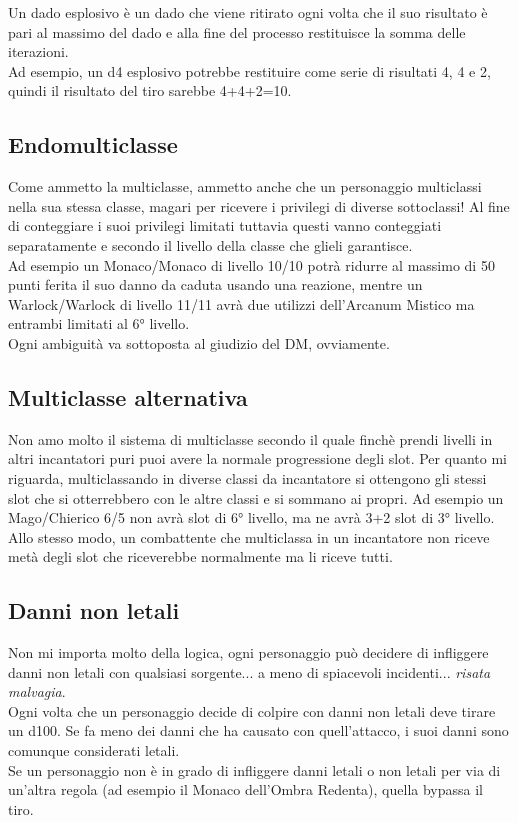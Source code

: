 Un dado esplosivo è un dado che viene ritirato ogni volta che il suo risultato è pari al massimo del dado e alla fine del processo restituisce la somma delle iterazioni. \\ Ad esempio, un d4 esplosivo potrebbe restituire come serie di risultati 4, 4 e 2, quindi il risultato del tiro sarebbe 4+4+2=10.

\subsection{Endomulticlasse}

Come ammetto la multiclasse, ammetto anche che un personaggio multiclassi nella sua stessa classe, magari per ricevere i privilegi di diverse sottoclassi! Al fine di conteggiare i suoi privilegi limitati tuttavia questi vanno conteggiati separatamente e secondo il livello della classe che glieli garantisce. \\ Ad esempio un Monaco/Monaco di livello 10/10 potrà ridurre al massimo di 50 punti ferita il suo danno da caduta usando una reazione, mentre un Warlock/Warlock di livello 11/11 avrà due utilizzi dell'Arcanum Mistico ma entrambi limitati al 6° livello. \\ Ogni ambiguità va sottoposta al giudizio del DM, ovviamente.

\subsection{Multiclasse alternativa}

Non amo molto il sistema di multiclasse secondo il quale finchè prendi livelli in altri incantatori puri puoi avere la normale progressione degli slot. Per quanto mi riguarda, multiclassando in diverse classi da incantatore si ottengono gli stessi slot che si otterrebbero con le altre classi e si sommano ai propri. Ad esempio un Mago/Chierico 6/5 non avrà slot di 6° livello, ma ne avrà 3+2 slot di 3° livello. Allo stesso modo, un combattente che multiclassa in un incantatore non riceve metà degli slot che riceverebbe normalmente ma li riceve tutti.

\subsection{Danni non letali}

Non mi importa molto della logica, ogni personaggio può decidere di infliggere danni non letali con qualsiasi sorgente... a meno di spiacevoli incidenti... \textit{risata malvagia}. \\ Ogni volta che un personaggio decide di colpire con danni non letali deve tirare un d100. Se fa meno dei danni che ha causato con quell'attacco, i suoi danni sono comunque considerati letali. \\ Se un personaggio non è in grado di infliggere danni letali o non letali per via di un'altra regola (ad esempio il Monaco dell'Ombra Redenta), quella bypassa il tiro.

